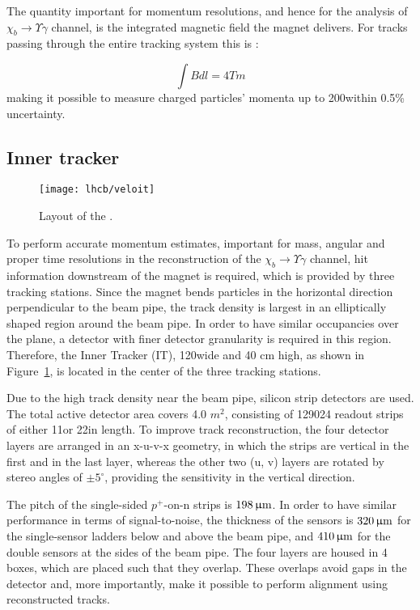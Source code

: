 The quantity important for momentum resolutions, and hence for the analysis of
$\chi_b \rightarrow \Upsilon \gamma$ channel, is the integrated magnetic field
the magnet delivers. For tracks passing through the entire tracking system this
is
\cite{Alves:2008zz}:   

$$ \int Bdl = 4 Tm $$ making it possible to measure charged particles' momenta
up to 200\gev within 0.5\% uncertainty.

\subsection{Inner tracker}

\begin{figure}[tb]
\begin{center}
\texttt{[image: lhcb/veloit]}
\end{center}
\caption{\small Layout of the \intr.}
\label{fig:veloit}
\end{figure}

To perform accurate momentum estimates, important for mass, angular and proper
time resolutions in the reconstruction of the $\chi_b \rightarrow \Upsilon
\gamma$ channel, hit information downstream of the magnet is required, which is
provided by three tracking stations. Since the magnet bends particles in the
horizontal direction perpendicular to the beam pipe, the track density is
largest in an elliptically shaped region around the beam pipe. In order to have
similar occupancies over the plane, a detector with finer detector granularity
is required in this region. Therefore, the Inner Tracker (IT), 120\cm wide and
40 cm high, as shown in Figure~\ref{fig:veloit}, is located in the center of
the three tracking stations.



Due to the high track density near the beam pipe, silicon strip detectors are
used. The total active detector area covers 4.0 $m^2$, consisting of 129024
readout strips of either 11\cm or 22\cm in length. To improve track
reconstruction, the four detector layers are arranged in an x-u-v-x geometry,
in which the strips are vertical in the first and in the last layer, whereas
the other two (u, v) layers are rotated by stereo angles of $\pm5^\circ$,
providing the sensitivity in the vertical direction.

The pitch of the single-sided $p^+$-on-n strips is $198{\,\upmu\rm m}$. In order to have
similar performance in terms of signal-to-noise, the thickness of the sensors
is $320{\,\upmu\rm m}$ for the single-sensor ladders below and above the beam pipe, and
$410{\,\upmu\rm m}$ for the double sensors at the sides of the beam pipe. The four
layers are housed in 4 boxes, which are placed such that they overlap. These
overlaps avoid gaps in the detector and, more importantly, make it possible to
perform alignment using reconstructed tracks.



